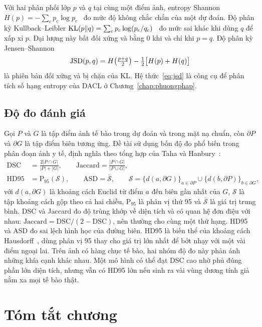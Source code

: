 Với hai phân phối lớp $p$ và $q$ tại cùng một điểm ảnh, entropy Shannon $H(p)=-\sum_c p_c\log p_c$~\cite{shannon1948} đo mức độ không chắc chắn của một dự đoán. Độ phân kỳ Kullback--Leibler $\mathrm{KL}(p\|q)=\sum_c p_c\log(p_c/q_c)$~\cite{kullback1951} đo mức sai khác khi dùng $q$ để xấp xỉ $p$. Đại lượng này bất đối xứng và bằng 0 khi và chỉ khi $p=q$. Độ phân kỳ Jensen--Shannon~\cite{lin1991jsd}
\begin{equation}
  \mathrm{JSD}(p,q)=H\!\left(\tfrac{p+q}{2}\right)-\tfrac12\big[H(p)+H(q)\big]
  \label{eq:jsd}
\end{equation}
là phiên bản đối xứng và bị chặn của KL. Hệ thức~\eqref{eq:jsd} là công cụ để phân tích số hạng entropy của DACL ở Chương~\ref{chap:phuongphap}.

\subsection{Độ đo đánh giá}

Gọi $P$ và $G$ là tập điểm ảnh tế bào trong dự đoán và trong mặt nạ chuẩn, còn $\partial P$ và $\partial G$ là tập điểm biên tương ứng. Đề tài sử dụng bốn độ đo phổ biến trong phân đoạn ảnh y tế, định nghĩa theo tổng hợp của Taha và Hanbury~\cite{taha2015metrics}:
\begin{align}
  \mathrm{DSC}&=\frac{2|P\cap G|}{|P|+|G|}, \qquad
  \mathrm{Jaccard}=\frac{|P\cap G|}{|P\cup G|},\\
  \mathrm{HD95}&=\mathrm{P}_{95}(\mathcal{S}), \qquad \mathrm{ASD}=\overline{\mathcal{S}},
  \qquad \mathcal{S}=\{d(a,\partial G)\}_{a\in\partial P}\cup\{d(b,\partial P)\}_{b\in\partial G},
\end{align}
với $d(a,\partial G)$ là khoảng cách Euclid từ điểm $a$ đến biên gần nhất của $G$, $\mathcal{S}$ là tập khoảng cách gộp theo cả hai chiều, $\mathrm{P}_{95}$ là phân vị thứ 95 và $\overline{\mathcal{S}}$ là giá trị trung bình. DSC và Jaccard đo độ trùng khớp về diện tích và có quan hệ đơn điệu với nhau: $\mathrm{Jaccard}=\mathrm{DSC}/(2-\mathrm{DSC})$, nên thường cho cùng một thứ hạng. HD95 và ASD đo sai lệch hình học của đường biên. HD95 là biến thể của khoảng cách Hausdorff~\cite{huttenlocher1993}, dùng phân vị 95 thay cho giá trị lớn nhất để bớt nhạy với một vài điểm ngoại lai. Trên ảnh có hàng chục tế bào, hai nhóm độ đo này phản ánh những khía cạnh khác nhau. Một mô hình có thể đạt DSC cao nhờ phủ đúng phần lớn diện tích, nhưng vẫn có HD95 lớn nếu sinh ra vài vùng dương tính giả nằm xa mọi tế bào thật.

\section{Tóm tắt chương}

